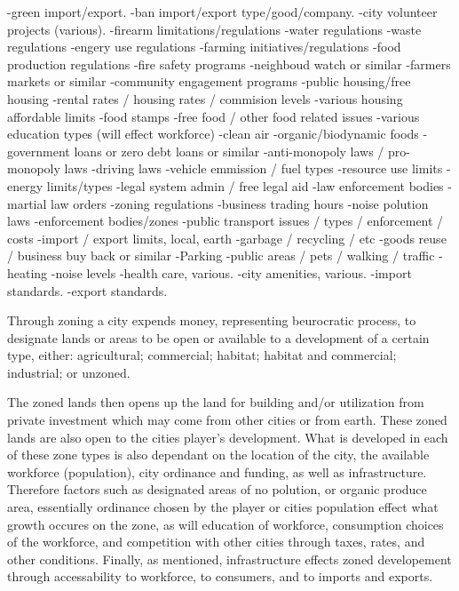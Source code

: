 -green import/export.
-ban import/export type/good/company.
-city volunteer projects (various).
-firearm limitations/regulations
-water regulations
-waste regulations
-engery use regulations
-farming initiatives/regulations
-food production regulations
-fire safety programs
-neighboud watch or similar
-farmers markets or similar
-community engagement programs
-public housing/free housing
-rental rates / housing rates / commision levels
-various housing affordable limits
-food stamps
-free food / other food related issues
-various education types (will effect workforce)
-clean air
-organic/biodynamic foods
-government loans or zero debt loans or similar
-anti-monopoly laws / pro-monopoly laws
-driving laws
-vehicle emmission / fuel types 
-resource use limits
-energy limits/types
-legal system admin / free legal aid
-law enforcement bodies
-martial law orders
-zoning regulations
-business trading hours
-noise polution laws
-enforcement bodies/zones
-public transport issues / types / enforcement / costs
-import / export limits, local, earth
-garbage / recycling / etc
-goods reuse / business buy back or similar
-Parking
-public areas / pets / walking / traffic
-heating
-noise levels
-health care, various.
-city amenities, various.
-import standards.
-export standards.




Through zoning a city expends money, representing beurocratic process, to designate lands or areas to be open or available to a development of a certain type, either: agricultural; commercial; habitat; habitat and commercial; industrial; or unzoned.

The zoned lands then opens up the land for building and/or utilization from private investment which may come from other cities or from earth. These zoned lands are also open to the cities player's development. 
What is developed in each of these zone types is also dependant on the location of the city, the available workforce (population), city ordinance and funding, as well as infrastructure. Therefore factors such as designated areas of no polution, or organic produce area, essentially ordinance chosen by the player or cities population effect what growth occures on the zone, as will education of workforce, consumption choices of the workforce, and competition with other cities through taxes, rates, and other conditions. Finally, as mentioned, infrastructure effects zoned developement through accessability to workforce, to consumers, and to imports and exports.



